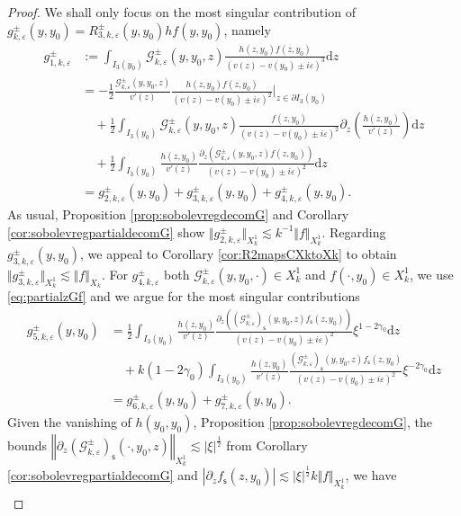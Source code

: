 \documentclass[11pt,reqno]{amsproc}
\theoremstyle{definition}
\numberwithin{equation}{section}
\newcommand{\G}{{\mathcal{G}}}
\newcommand{\s}{{\mathsf{s}}}
\renewcommand{\d}{\mathrm{d}}
\newcommand{\ep}{\varepsilon}
\begin{document}
\begin{proof}
We shall only focus on the most singular contribution of $g_{k,\ep}^\pm(y,y_0) = R_{3,k,\ep}^\pm(y,y_0)hf(y,y_0)$, namely
\begin{align*}
g_{1,k,\ep}^\pm &:= \int_{I_3(y_0)} \G_{k,\ep}^\pm(y,y_0,z) \frac{h(z,y_0)f(z,y_0)}{(v(z) - v(y_0) \pm i\ep)^3} \d z \\
&= -\frac{1}{2}  \frac{\G_{k,\ep}^\pm(y,y_0,z)}{v'(z)} \frac{h(z,y_0)f(z,y_0)}{(v(z) - v(y_0) \pm i\ep)^2} \Big|_{z\in \partial I_3(y_0)} \\
&\quad +\frac12 \int_{I_3(y_0)} \G_{k,\ep}^\pm(y,y_0,z) \frac{f(z,y_0)}{(v(z) - v(y_0) \pm i\ep)^2}\partial_z \left( \frac{h(z,y_0)}{v'(z)} \right) \d z \\
&\quad +\frac12 \int_{I_3(y_0)} \frac{h(z,y_0)}{v'(z)} \frac{\partial_z \left( \G_{k,\ep}^\pm(y,y_0,z) f(z,y_0) \right)}{(v(z) - v(y_0) \pm i\ep)^2} \d z \\
&= g_{2,k,\ep}^\pm(y,y_0) + g_{3,k,\ep}^\pm(y,y_0) + g_{4,k,\ep}^\pm(y,y_0).
\end{align*}
As usual, Proposition \ref{prop:sobolevregdecomG} and Corollary \ref{cor:sobolevregpartialdecomG} show $\Vert g_{2,k,\ep}^\pm \Vert_{X_k^1} \lesssim k^{-1}\Vert f \Vert_{X_k^1}$. Regarding $g_{3,k,\ep}^\pm(y,y_0)$, we appeal to Corollary \ref{cor:R2mapsCXktoXk} to obtain $\Vert g_{3,k,\ep}^\pm\Vert_{X_k^1}\lesssim \Vert f \Vert _{X_k}$. For $g_{4,k,\ep}^\pm$ both $\G_{k,\ep}^\pm(y,y_0,\cdot)\in X_k^1$ and $f(\cdot,y_0)\in X_k^1$, we use \eqref{eq:partialzGf} and we argue for the most singular contributions
\begin{align*}
g_{5,k,\ep}^\pm(y,y_0) &= \frac12 \int_{I_3(y_0)} \frac{h(z,y_0)}{v'(z)} \frac{\partial_z \left( \left(\G_{k,\ep}^\pm\right)_\s(y,y_0,z) f_\s(z,y_0) \right)}{(v(z) - v(y_0) \pm i\ep)^2}\xi^{1-2\gamma_0} \d z \\
&\quad + k(1-2\gamma_0) \int_{I_3(y_0)} \frac{h(z,y_0)}{v'(z)} \frac{ \left( \G_{k,\ep}^\pm\right)_\s (y,y_0,z) f_\s(z,y_0) }{(v(z) - v(y_0) \pm i\ep)^2}\xi^{-2\gamma_0} \d z  \\
&= g_{6,k,\ep}^\pm(y,y_0) + g_{7,k,\ep}^\pm(y,y_0).
\end{align*}
Given the vanishing of $h(y_0,y_0)$, Proposition \ref{prop:sobolevregdecomG}, the bounds $\left\Vert \partial_z \left(\G_{k,\ep}^\pm\right)_\s (\cdot,y_0,z) \right\Vert_{X_k^1} \lesssim |\xi|^\frac12$ from  Corollary \ref{cor:sobolevregpartialdecomG} and $\left| \partial_z f_\s(z,y_0) \right| \lesssim |\xi|^\frac12 k\Vert f \Vert_{X_k^1}$, we have 
\begin{align*}

\end{align*}
\end{proof}
\end{document}
